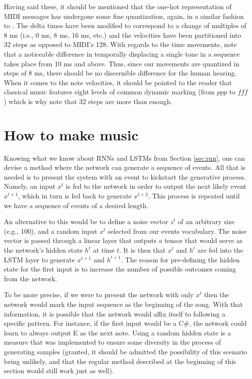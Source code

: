 \documentclass[a4paper]{book}
\begin{document}
Having said these, it should be mentioned that the one-hot representation of MIDI messages has undergone some fine quantization, again, in a similar fashion to \textcite{oore_this_2018}. The delta times have been modified to correspond to a change of multiples of 8 ms (i.e., 0 ms, 8 ms, 16 ms, etc.) and the velocities have been partitioned into 32 steps as opposed to MIDI's 128. With regards to the time movements, \textcite{friberg_overview_2006} note that a noticeable difference in temporally displacing a single tone in a sequence takes place from 10 ms and above. Thus, since our movements are quantized in steps of 8 ms, there should be no discernible difference for the human hearing. When it comes to the note velocities, it should be pointed to the reader that classical music features eight levels of common dynamic marking (from $ppp$ to $fff$) which is why \textcite{oore_this_2018} note that 32 steps are more than enough.

\section{How to make music} \label{sec:how_to_gen}

Knowing what we know about RNNs and LSTMs from Section \ref{sec:rnn}, one can devise a method where the network can generate a sequence of events. All that is needed is to present the system with an event to kickstart the generative process. Namely, an input $x^t$ is fed to the network in order to output the next likely event $x^{t+1}$, which in turn is fed back to generate $x^{t+2}$. This process is repeated until we have a sequence of events of a desired length.

An alternative to this would be to define a noise vector $z^t$ of an arbitrary size (e.g., 100), and a random input $x^t$ selected from our events vocabulary. The noise vector is passed through a linear layer that outputs a tensor that would serve as the network's hidden state $h^{t}$ at time $t$. It is then that $x^t$ and $h^{t}$ are fed into the LSTM layer to generate $x^{t+1}$ and $h^{t+1}$. The reason for pre-defining the hidden state for the first input is to increase the number of possible outcomes coming from the network.

To be more precise, if we were to present the network with only $x^t$ then the network would mark the input sequence as the beginning of the song. With that information, it is possible that the network would affix itself to following a specific pattern. For instance, if the first input would be a C\#, the network could learn to always output E as the next note. Using a random hidden state is a measure that was implemented to ensure some diversity in the process of generating samples (granted, it should be admitted the possibility of this scenario being unlikely, and that the regular method described at the beginning of this section would still work just as well).
\end{document}

